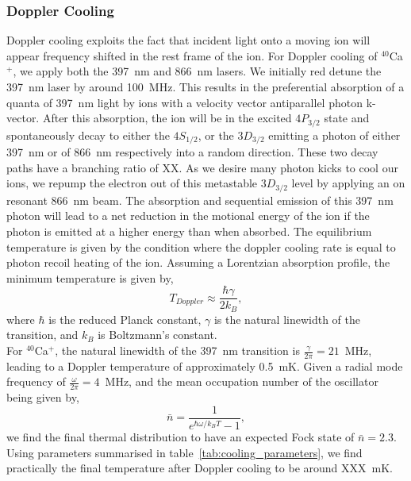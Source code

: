 \documentclass[12pt]{report}
\begin{document}
    \subsubsection{Doppler Cooling}
    Doppler cooling exploits the fact that incident light onto a moving ion will
    appear frequency shifted in the rest frame of the ion. For Doppler cooling
    of $^{40}$Ca$^+$, we apply both the 397~nm and 866~nm lasers. We initially red
    detune the 397~nm laser by around 100~MHz. This results in the preferential
    absorption of a quanta of 397~nm light by ions with a velocity vector
    antiparallel photon k-vector. After this absorption, the ion will be in the
    excited $4P_{3/2}$ state and spontaneously decay to either the $4S_{1/2}$,
    or the $3D_{3/2}$ emitting a photon of either 397~nm or of 866~nm
    respectively into a random direction. These two decay paths have a branching
    ratio of XX.  As we desire many photon kicks to cool our ions, we repump the
    electron out of this metastable $3D_{3/2}$ level by applying an on resonant
    866~nm beam.  The absorption and sequential emission of this 397~nm photon
    will lead to a net reduction in the motional energy of the ion if the photon
    is emitted at a higher energy than when absorbed. The equilibrium
    temperature is given by the condition where the doppler cooling rate is
    equal to photon recoil heating of the ion. Assuming a Lorentzian absorption
    profile, the minimum temperature is given by,
    \begin{equation}
    T_{Doppler} \approx \frac{\hbar\gamma}{2k_B},
    \end{equation}
    where $\hbar$ is the reduced Planck constant, $\gamma$ is the natural
    linewidth of the transition, and $k_B$ is Boltzmann's constant.\\ For
    $^{40}$Ca$^+$, the natural linewidth of the 397~nm transition is $\frac{\gamma}{2\pi} =
    21$~MHz, leading to a Doppler temperature of approximately 0.5~mK. Given a radial mode frequency of $\frac{\omega}{2\pi} = 4$~MHz, and the mean occupation number of the oscillator being given by,
    \begin{equation}
        \bar{n} = \frac{1}{e^{\hbar\omega/k_B T}-1},
    \end{equation}
    we find the final thermal distribution to have an expected Fock state of $\bar{n} = 2.3$.
    Using parameters summarised in table~\ref{tab:cooling_parameters}, we find practically the final temperature after Doppler cooling to be around XXX~mK.\\
\end{document}
